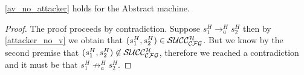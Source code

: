 \begin{lemma}
  \label{av_no_attacker_S}
  \cref{av_no_attacker} holds for the Abstract machine.
\end{lemma}
\begin{proof}
  The proof proceeds by contradiction. 
  Suppose $s^H_1 \to^H_a s^H_2$ then by \cref{attacker_no_v}
  we obtain that $(s^H_1,s^H_2) \in \mathcal{SUCC_\mathcal{CFG}^{H}}$. But we know
  by the second premise that $(s^H_1,s^H_2) \not \in \mathcal{SUCC_\mathcal{CFG}^{H}}$,
  therefore we reached a contradiction and it must be that
  $s^H_1 \not \to^H_a s^H_2$.
\end{proof}
